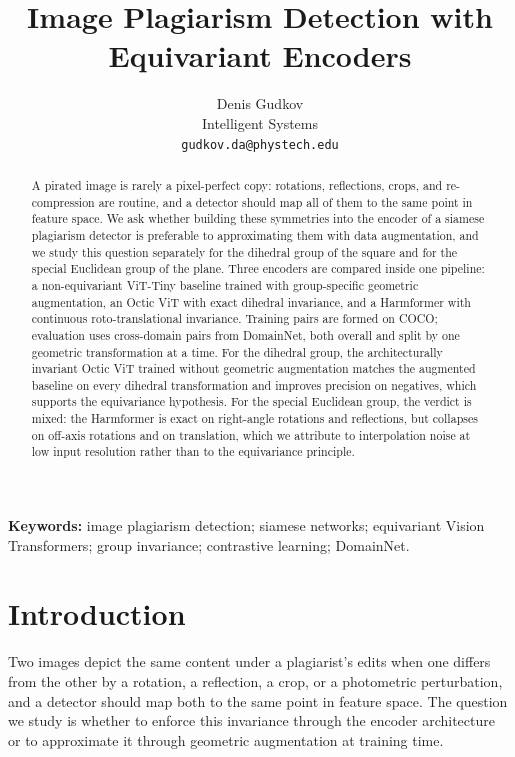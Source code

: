 \documentclass{article}
\title{Image Plagiarism Detection with Equivariant Encoders}
\author{%
  Denis Gudkov\\
  Intelligent Systems \\
  \texttt{gudkov.da@phystech.edu}
}
\begin{document}
\maketitle

\begin{abstract}
A pirated image is rarely a pixel-perfect copy: rotations, reflections, crops,
and re-compression are routine, and a detector should map all of them to the same
point in feature space. We ask whether building these symmetries into the encoder of a
siamese plagiarism detector is preferable to approximating them with data augmentation,
and we study this question separately for the dihedral group of the square and for the
special Euclidean group of the plane. Three encoders are compared inside one pipeline: a
non-equivariant ViT-Tiny baseline trained with group-specific geometric augmentation, an
Octic ViT with exact dihedral invariance, and a Harmformer with continuous roto-translational
invariance. Training pairs are formed on COCO; evaluation uses cross-domain pairs from
DomainNet, both overall and split by one geometric transformation at a time. For the
dihedral group, the architecturally invariant Octic ViT trained without geometric
augmentation matches the augmented baseline on every dihedral transformation and improves
precision on negatives, which supports the equivariance hypothesis. For the special
Euclidean group, the verdict is mixed: the Harmformer is exact on right-angle rotations
and reflections, but collapses on off-axis rotations and on translation, which we attribute
to interpolation noise at low input resolution rather than to the equivariance principle.
\end{abstract}

\textbf{Keywords:} image plagiarism detection; siamese networks; equivariant Vision Transformers;
 group invariance; contrastive learning; DomainNet.

\section{Introduction}\label{sec:intro}

Two images depict the same content under a plagiarist's edits when one differs from the other by a rotation, a reflection, a crop, or a photometric perturbation, and a detector should map both to the same point in feature space. The question we study is whether to enforce this invariance through the encoder architecture or to approximate it through geometric augmentation at training time. 
\end{document}
